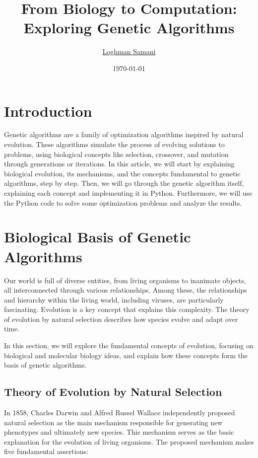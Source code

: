 \documentclass[12pt]{article}
\title{\huge From Biology to Computation: Exploring Genetic Algorithms}
\author{\href{samaniloqman91@gmail.com}{Loghman Samani}}
\date{\today}
\begin{document}
\maketitle

\newpage

\tableofcontents

\newpage

\section{Introduction}

Genetic algorithms are a family of optimization algorithms inspired by natural evolution. These algorithms simulate the process of evolving solutions to problems, using biological concepts like selection, crossover, and mutation through generations or iterations. In this article, we will start by explaining biological evolution, its mechanisms, and the concepts fundamental to genetic algorithms, step by step. Then, we will go through the genetic algorithm itself, explaining each concept and implementing it in Python. Furthermore, we will use the Python code to solve some optimization problems and analyze the results.\\[6px]

\section{Biological Basis of Genetic Algorithms}

Our world is full of diverse entities, from living organisms to inanimate objects, all interconnected through various relationships. Among these, the relationships and hierarchy within the living world, including viruses, are particularly fascinating. Evolution is a key concept that explains this complexity. The theory of evolution by natural selection describes how species evolve and adapt over time.

In this section, we will explore the fundamental concepts of evolution, focusing on biological and molecular biology ideas, and explain how these concepts form the basis of genetic algorithms.\\[6px]


\subsection{Theory of Evolution by Natural Selection}

In 1858, Charles Darwin and Alfred Russel Wallace independently proposed natural selection as the main mechanism responsible for generating new phenotypes and ultimately new species. This mechanism serves as the basic explanation for the evolution of living organisms. The proposed mechanism makes five fundamental assertions:\\[5px]
\end{document}
